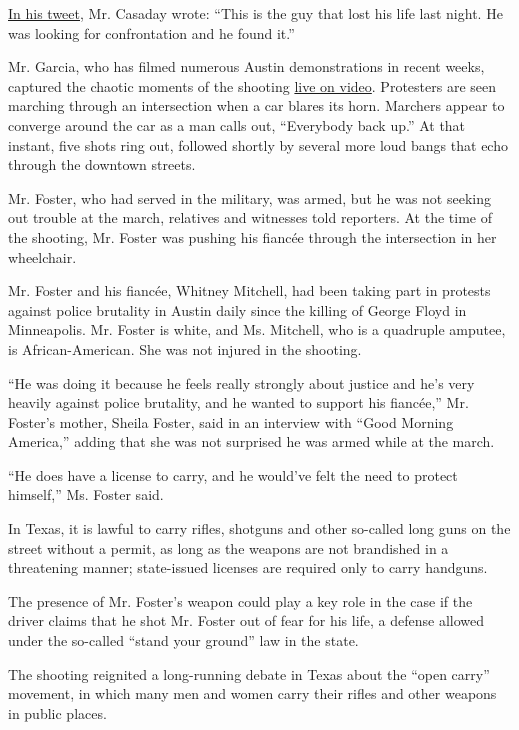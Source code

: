 \href{https://twitter.com/KennethCasaday/status/1287373267318300674}{In
his tweet}, Mr. Casaday wrote: ``This is the guy that lost his life last
night. He was looking for confrontation and he found it.''

Mr. Garcia, who has filmed numerous Austin demonstrations in recent
weeks, captured the chaotic moments of the shooting
\href{https://www.facebook.com/watch/live/?v=295346775139805\&ref=watch_permalink}{live
on video}. Protesters are seen marching through an intersection when a
car blares its horn. Marchers appear to converge around the car as a man
calls out, ``Everybody back up.'' At that instant, five shots ring out,
followed shortly by several more loud bangs that echo through the
downtown streets.

Mr. Foster, who had served in the military, was armed, but he was not
seeking out trouble at the march, relatives and witnesses told
reporters. At the time of the shooting, Mr. Foster was pushing his
fiancée through the intersection in her wheelchair.

Mr. Foster and his fiancée, Whitney Mitchell, had been taking part in
protests against police brutality in Austin daily since the killing of
George Floyd in Minneapolis. Mr. Foster is white, and Ms. Mitchell, who
is a quadruple amputee, is African-American. She was not injured in the
shooting.

``He was doing it because he feels really strongly about justice and
he's very heavily against police brutality, and he wanted to support his
fiancée,'' Mr. Foster's mother, Sheila Foster, said in an interview with
``Good Morning America,'' adding that she was not surprised he was armed
while at the march.

``He does have a license to carry, and he would've felt the need to
protect himself,'' Ms. Foster said.

In Texas, it is lawful to carry rifles, shotguns and other so-called
long guns on the street without a permit, as long as the weapons are not
brandished in a threatening manner; state-issued licenses are required
only to carry handguns.

The presence of Mr. Foster's weapon could play a key role in the case if
the driver claims that he shot Mr. Foster out of fear for his life, a
defense allowed under the so-called ``stand your ground'' law in the
state.

The shooting reignited a long-running debate in Texas about the ``open
carry'' movement, in which many men and women carry their rifles and
other weapons in public places.

